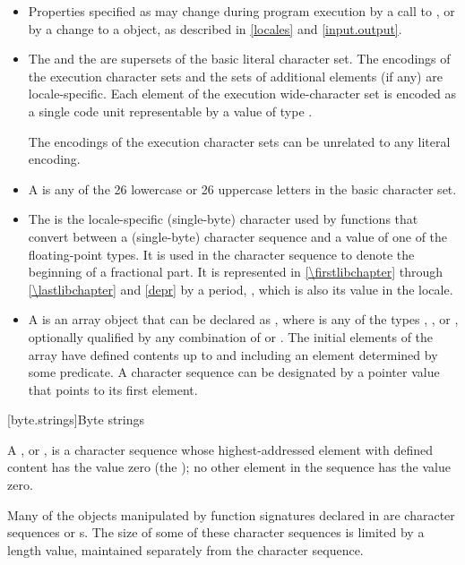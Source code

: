 \begin{itemize}
\item
Properties specified as 
may change during program execution
by a call to , or
by a change to a  object,
as described in \ref{locales} and \ref{input.output}.
\item
The  and
the 
are supersets of the basic literal character set.
The encodings of the execution character sets and
the sets of additional elements (if any) are locale-specific.
Each element of the execution wide-character set is encoded as
a single code unit representable by a value of type .
\begin{note}
The encodings of the execution character sets can be unrelated
to any literal encoding.
\end{note}
\item
A  is any of the 26 lowercase or 26
%
%
uppercase letters in the basic character set.
\item
The
is the locale-specific
(single-byte) character used by functions that convert between a (single-byte)
character sequence and a value of one of the floating-point types.
It is used
in the character sequence to denote the beginning of a fractional part.
It is
represented in \ref{\firstlibchapter} through \ref{\lastlibchapter}
and \ref{depr} by a period,
%
,
which is
also its value in the 
locale.
\item
A
is an array object  that
can be declared as
,
where  is any of the types
,
,
or
, optionally qualified by any combination of
or
.
The initial elements of the
array have defined contents up to and including an element determined by some
predicate.
A character sequence can be designated by a pointer value
 that points to its first element.
\end{itemize}

[byte.strings]{Byte strings}

%
\pnum
A ,
or \ntbs{},
is a character sequence whose highest-addressed element
with defined content has the value zero
(the );
no other element in the sequence has the value zero.
\begin{footnote}
Many of the objects manipulated by
function signatures declared in
 are character sequences or \ntbs{}s.
The size of some of these character sequences is limited by
a length value, maintained separately from the character sequence.
\end{footnote}


